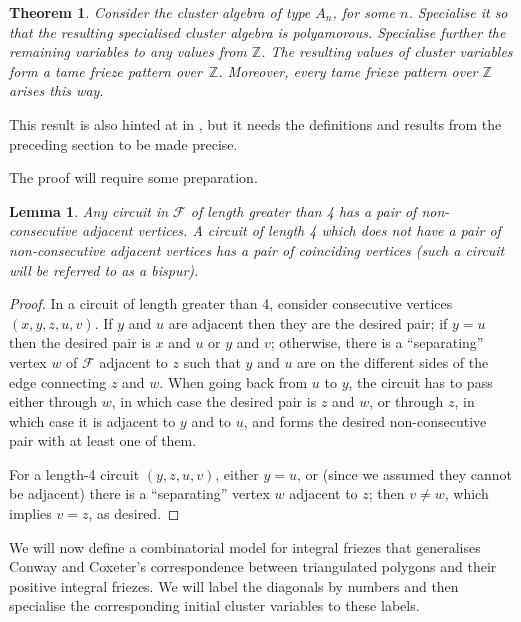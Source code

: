 \documentclass[12pt]{article}
\newtheorem{theorem}{Theorem}
\newtheorem{lemma}{Lemma}
\theoremstyle{definition}
\newcommand{\Z}{\mathbb{Z}}
\newcommand{\F}{\mathscr{F}}
\begin{document}
\begin{theorem}
\label{thm:poly:friezes}
Consider the cluster algebra of type $A_n$, for some $n$. Specialise it so that the resulting specialised cluster algebra is polyamorous. Specialise further the remaining variables to any values from $\Z$. The resulting values of cluster variables form a tame frieze pattern over~$\Z$. Moreover, every tame frieze pattern over $\Z$ arises this way.
\end{theorem}
This result is also hinted at in \cite[Remark 2.12(b)]{CuntzModel}, but it needs the definitions and results from the preceding section to be made precise.

The proof will require some preparation.
\begin{lemma}
\label{lemma:cycle34}
Any circuit in $\F$ of length greater than 4 has a pair of non-consecutive adjacent vertices. A circuit of length 4 which does not have a pair of non-consecutive adjacent vertices has a pair of coinciding vertices (such a circuit will be referred to as a \emph{bispur}).
\end{lemma}
\begin{proof}
In a circuit of length greater than 4, consider consecutive vertices $(x,y,z,u,v)$. If $y$ and $u$ are adjacent then they are the desired pair; if $y=u$ then the desired pair is $x$ and $u$ or $y$ and $v$; otherwise, there is a ``separating'' vertex $w$ of $\F$ adjacent to $z$ such that $y$ and $u$ are on the different sides of the edge connecting $z$ and $w$. When going back from $u$ to $y$, the circuit has to pass either through $w$, in which case the desired pair is $z$ and $w$, or through $z$, in which case it is adjacent to $y$ and to $u$, and forms the desired non-consecutive pair with at least one of them.

For a length-4 circuit $(y,z,u,v)$, either $y=u$, or (since we assumed they cannot be adjacent) there is a ``separating'' vertex $w$ adjacent to $z$; then $v\ne w$, which implies $v=z$, as desired.
\end{proof}

We will now define a combinatorial model for integral friezes that generalises Conway and Coxeter's correspondence between triangulated polygons and their positive integral friezes. We will label the diagonals by numbers and then specialise the corresponding initial cluster variables to these labels.
\end{document}
